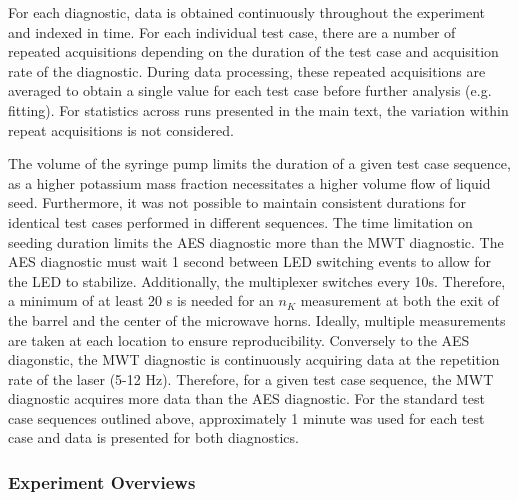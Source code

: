 For each diagnostic, data is obtained continuously throughout the experiment and indexed in time. For each individual test case, there are a number of repeated acquisitions depending on the duration of the test case and acquisition rate of the diagnostic. During data processing, these repeated acquisitions are averaged to obtain a single value for each test case before further analysis (e.g. fitting). For statistics across runs presented in the main text, the variation within repeat acquisitions is not considered.

The volume of the syringe pump limits the duration of a given test case sequence, as a higher potassium mass fraction necessitates a higher volume flow of liquid seed. Furthermore, it was not possible to maintain consistent durations for identical test cases performed in different sequences. %
The time limitation on seeding duration limits the AES diagnostic more than the MWT diagnostic. The AES diagnostic must wait 1 second between LED switching events to allow for the LED to stabilize. Additionally, the multiplexer switches every 10s. Therefore, a minimum of at least 20 s is needed for an $n_K$ measurement at both the exit of the barrel and the center of the microwave horns. Ideally, multiple measurements are taken at each location to ensure reproducibility. %
Conversely to the AES diagonstic, the MWT diagnostic is continuously acquiring data at the repetition rate of the laser (5-12 Hz). Therefore, for a given test case sequence, the MWT diagnostic acquires more data than the AES diagnostic. %
For the standard test case sequences outlined above, approximately 1 minute was used for each test case and data is presented for both diagnostics. %




\subsubsection{Experiment Overviews}

